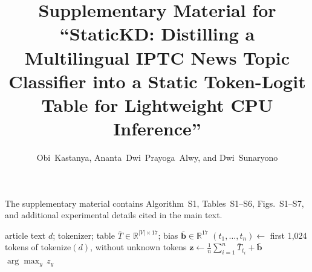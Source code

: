\documentclass[journal,onecolumn]{IEEEtran}
\begin{document}
\title{Supplementary Material for ``StaticKD: Distilling a Multilingual IPTC News Topic Classifier into a Static Token-Logit Table for Lightweight CPU Inference''}
\author{Obi~Kastanya, Ananta~Dwi~Prayoga~Alwy, and Dwi~Sunaryono}
\maketitle

The supplementary material contains Algorithm~S1, Tables~S1--S6, Figs.~S1--S7, and additional experimental details cited in the main text.

\begin{algorithm}[!htbp]
\caption{StaticKD Inference for One Article}
\label{alg:infer}
\begin{algorithmic}[1]
\Require article text $d$; tokenizer; table $\bar{T}\in\mathbb{R}^{|V|\times 17}$; bias $\bar{\mathbf{b}}\in\mathbb{R}^{17}$
\State $(t_1,\dots,t_n)\gets$ first 1,024 tokens of tokenize$(d)$, without unknown tokens
\State $\mathbf{z}\gets\frac{1}{n}\sum_{i=1}^{n}\bar{T}_{t_i}+\bar{\mathbf{b}}$ 
\State \Return $\arg\max_{y}\,z_y$ 
\end{algorithmic}
\end{algorithm}
\end{document}
